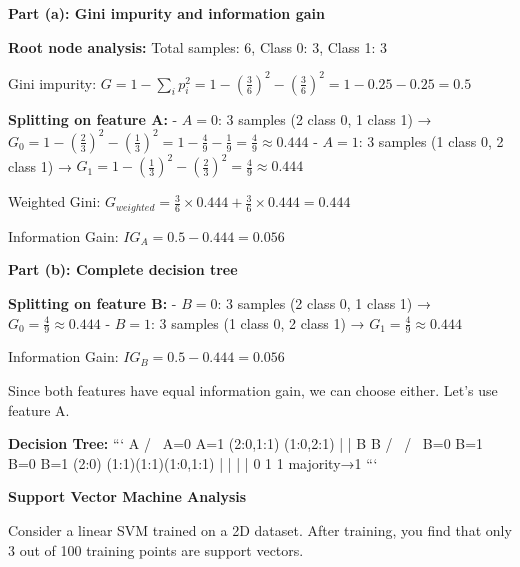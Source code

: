 \documentclass{../../common/quals-template}
\begin{document}
\begin{questions}

\begin{solution}
\textbf{Part (a): Gini impurity and information gain}

\textbf{Root node analysis:}
Total samples: 6, Class 0: 3, Class 1: 3

Gini impurity: $G = 1 - \sum_{i} p_i^2 = 1 - \left(\frac{3}{6}\right)^2 - \left(\frac{3}{6}\right)^2 = 1 - 0.25 - 0.25 = 0.5$

\textbf{Splitting on feature A:}
- $A = 0$: 3 samples (2 class 0, 1 class 1) → $G_0 = 1 - \left(\frac{2}{3}\right)^2 - \left(\frac{1}{3}\right)^2 = 1 - \frac{4}{9} - \frac{1}{9} = \frac{4}{9} ≈ 0.444$
- $A = 1$: 3 samples (1 class 0, 2 class 1) → $G_1 = 1 - \left(\frac{1}{3}\right)^2 - \left(\frac{2}{3}\right)^2 = \frac{4}{9} ≈ 0.444$

Weighted Gini: $G_{weighted} = \frac{3}{6} \times 0.444 + \frac{3}{6} \times 0.444 = 0.444$

Information Gain: $IG_A = 0.5 - 0.444 = 0.056$

\textbf{Part (b): Complete decision tree}

\textbf{Splitting on feature B:}
- $B = 0$: 3 samples (2 class 0, 1 class 1) → $G_0 = \frac{4}{9} ≈ 0.444$
- $B = 1$: 3 samples (1 class 0, 2 class 1) → $G_1 = \frac{4}{9} ≈ 0.444$

Information Gain: $IG_B = 0.5 - 0.444 = 0.056$

Since both features have equal information gain, we can choose either. Let's use feature A.

\textbf{Decision Tree:}
```
         A
       /   \
    A=0       A=1
  (2:0,1:1)  (1:0,2:1)
      |         |
      B         B
    /   \     /   \
  B=0   B=1 B=0   B=1
 (2:0) (1:1)(1:1)(1:0,1:1)
   |     |    |      |
   0     1    1    majority→1
```
\end{solution}

\question[5] \textbf{Support Vector Machine Analysis}

Consider a linear SVM trained on a 2D dataset. After training, you find that only 3 out of 100 training points are support vectors.

\begin{parts}

\end{parts}
\end{questions}
\end{document}
